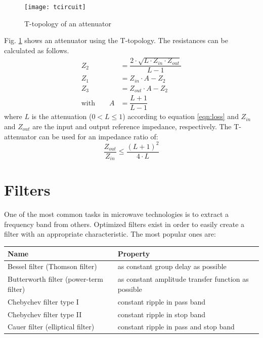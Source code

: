 \begin{figure}[ht]
\begin{center}
\texttt{[image: tcircuit]}
\end{center}
\caption{T-topology of an attenuator}
\label{fig:t_attenuator}
\end{figure}
\FloatBarrier

Fig. \ref{fig:t_attenuator} shows an attenuator using the
T-topology. The resistances can be calculated as follows.
\begin{align}
Z_2 & = \dfrac{2\cdot \sqrt{L\cdot Z_{in}\cdot Z_{out}}}{L - 1} \\
Z_1 & = Z_{in}\cdot A - Z_2 \\
Z_3 & = Z_{out}\cdot A - Z_2 \\
\textrm{with} \qquad A & = \dfrac{L + 1}{L - 1}
\end{align}
where $L$ is the attenuation ($0 < L\le 1$) according to
equation \ref{eqn:loss} and $Z_{in}$ and $Z_{out}$
are the input and output reference impedance, respectively.
The T-attenuator can be used for an impedance ratio of:
\begin{equation}
\dfrac{Z_{out}}{Z_{in}} \le \dfrac{(L+1)^2}{4\cdot L}
\end{equation}

\section{Filters}

One of the most common tasks in microwave technologies is to
extract a frequency band from others. Optimized filters exist
in order to easily create a filter with an appropriate characteristic.
The most popular ones are:

\addvspace{12pt}

\begin{tabular}{l|l}
Name & Property \\
\hline
Bessel filter (Thomson filter) & as constant group delay as possible \\
Butterworth filter (power-term filter) & as constant amplitude transfer function as possible \\
Chebychev filter type I & constant ripple in pass band \\
Chebychev filter type II & constant ripple in stop band \\
Cauer filter (elliptical filter) & constant ripple in pass and stop band \\
\end{tabular}

